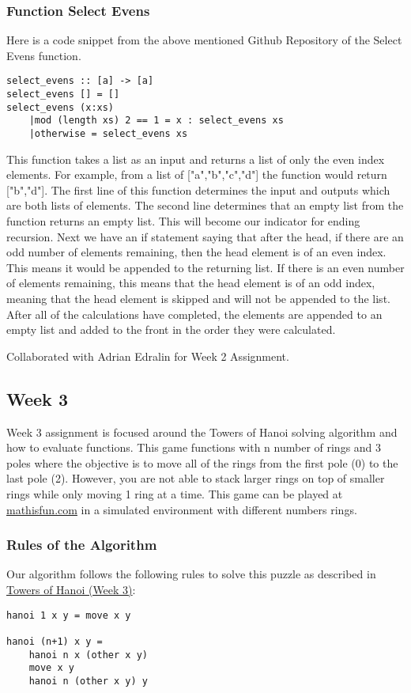 \documentclass{article}
\theoremstyle{theorem}
\theoremstyle{definition}
\theoremstyle{remark}
\begin{document}
\subsubsection{Function Select Evens}
Here is a code snippet from the above mentioned Github Repository of the Select Evens function.
\begin{lstlisting}
select_evens :: [a] -> [a]
select_evens [] = []
select_evens (x:xs)
    |mod (length xs) 2 == 1 = x : select_evens xs
    |otherwise = select_evens xs
\end{lstlisting}
This function takes a list as an input and returns a list of only the even index elements. For example, from a list of ["a","b","c","d"] the function would return ["b","d"]. The first line of this function determines the input and outputs which are both lists of elements. The second line determines that an empty list from the function returns an empty list. This will become our indicator for ending recursion. Next we have an if statement saying that after the head, if there are an odd number of elements remaining, then the head element is of an even index. This means it would be appended to the returning list. If there is an even number of elements remaining, this means that the head element is of an odd index, meaning that the head element is skipped and will not be appended to the list. After all of the calculations have completed, the elements are appended to an empty list and added to the front in the order they were calculated.

Collaborated with Adrian Edralin for Week 2 Assignment.

\subsection{Week 3}
Week 3 assignment is focused around the Towers of Hanoi solving algorithm and how to evaluate functions. This game functions with n number of rings and 3 poles where the objective is to move all of the rings from the first pole (0) to the last pole (2). However, you are not able to stack larger rings on top of smaller rings while only moving 1 ring at a time. This game can be played at \href{https://www.mathsisfun.com/games/towerofhanoi.html}{mathisfun.com} in a simulated environment with different numbers rings.

\subsubsection{Rules of the Algorithm}
Our algorithm follows the following rules to solve this puzzle as described in \href{https://hackmd.io/@alexhkurz/rJQwvpyMY}{Towers of Hanoi (Week 3)}:
\begin{lstlisting}
hanoi 1 x y = move x y

hanoi (n+1) x y = 
	hanoi n x (other x y) 
	move x y 
	hanoi n (other x y) y
\end{lstlisting}
\end{document}
